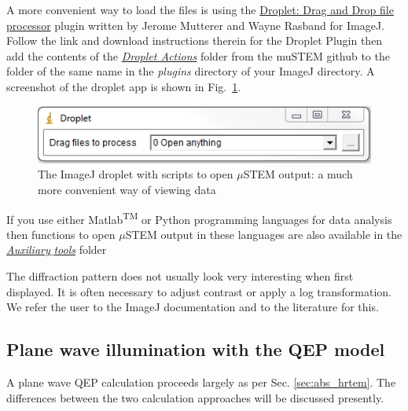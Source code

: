\documentclass[12pt,a4paper]{article}
\begin{document}
A more convenient way to load the files is using the \href{http://imagejdocu.tudor.lu/doku.php?id=plugin:utilities:droplet:start}{Droplet: Drag and Drop file processor} plugin written by Jerome Mutterer and Wayne Rasband for ImageJ. Follow the link and download instructions therein for the Droplet Plugin then add the contents of the \href{https://github.com/HamishGBrown/MuSTEM/tree/master/Auxiliary_tools/Droplet Actions}{\emph{Droplet Actions}} folder from the muSTEM github to the folder of the same name in the \emph{plugins} directory of your ImageJ directory. A screenshot of the droplet app is shown in Fig.~\ref{fig:ImageJ_Droplet}.
\begin{figure}[h!]
	\begin{center}
		\includegraphics[scale=0.75]{figures/ImageJ_droplet.png}
		\caption{The ImageJ droplet with scripts to open $\mu$STEM output: a much more convenient way of viewing data\label{fig:ImageJ_Droplet}}
	\end{center}
\end{figure}

If you use either Matlab\textsuperscript{TM} or Python programming languages for data analysis then functions to open $\mu$STEM output in these languages are also available in the \href{https://github.com/HamishGBrown/MuSTEM/tree/master/Auxiliary_tools}{\emph{Auxiliary$\_$tools}} folder

The diffraction pattern does not usually look very interesting when first displayed.
It is often necessary to adjust contrast or apply a log transformation.
We refer the user to the ImageJ documentation and to the literature for this.

\subsection{Plane wave illumination with the QEP model}
\label{qep_hrtem}

A plane wave QEP calculation proceeds largely as per Sec. \ref{sec:abs_hrtem}. 
The differences between the two calculation approaches will be discussed presently.
\end{document}
